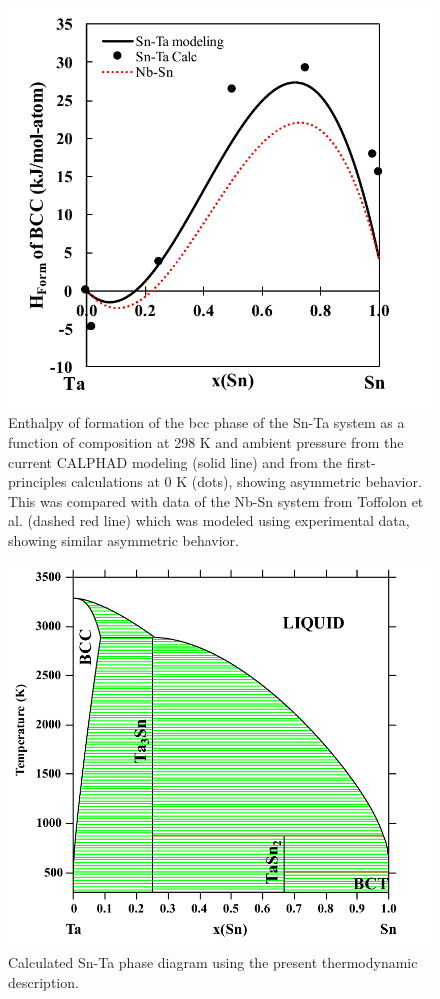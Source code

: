 \pagebreak
\begin{figure}[H]
	\centering
	\includegraphics[width=\textwidth]{Chapter-4/Figures/HofForm.pdf}
	\caption{Enthalpy of formation of the bcc phase of the Sn-Ta system as a function of composition at 298 K and ambient pressure from the current CALPHAD modeling (solid line) and from the first-principles calculations at 0 K (dots), showing asymmetric behavior. This was compared with data of the Nb-Sn system from Toffolon et al. \cite{Toffolon1998} (dashed red line) which was modeled using experimental data, showing similar asymmetric behavior.}
	\label{Ch4-figure:HofForm}
\end{figure}

\pagebreak
\begin{figure}[H]
	\centering
	\includegraphics[width=\textwidth]{Chapter-4/Figures/SnTaPD.pdf}
	\caption{Calculated Sn-Ta phase diagram using the present thermodynamic description.}
	\label{Ch4-figure:SnTaPD}
\end{figure}

